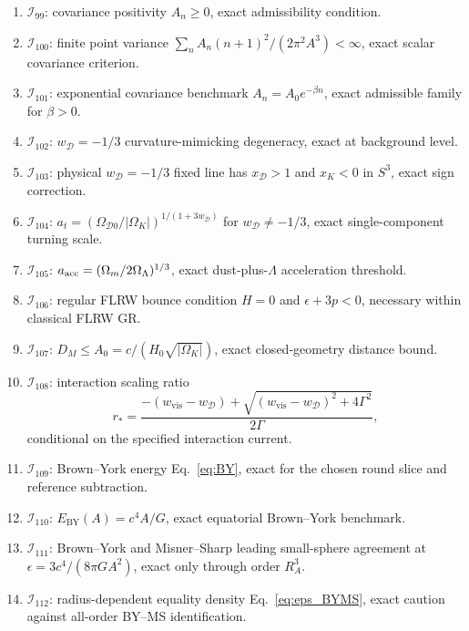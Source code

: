 \documentclass[
  aps,
  prd,
  reprint,
  superscriptaddress,
  nofootinbib,
  floatfix,
  longbibliography
]{revtex4-2}
\newcommand{\D}{\mathcal D}
\newcommand{\vis}{\mathrm{vis}}
\newcommand{\BY}{\mathrm{BY}}
\newcommand{\Inv}{\mathcal I}
\begin{document}
\begin{enumerate}
\item \(\Inv_{99}\): covariance positivity \(A_n\ge0\), exact admissibility
condition.

\item \(\Inv_{100}\): finite point variance
\(\sum_nA_n(n+1)^2/(2\pi^2A^3)<\infty\), exact scalar covariance criterion.

\item \(\Inv_{101}\): exponential covariance benchmark
\(A_n=A_0e^{-\beta n}\), exact admissible family for \(\beta>0\).

\item \(\Inv_{102}\): \(w_\D=-1/3\) curvature-mimicking degeneracy, exact at
background level.

\item \(\Inv_{103}\): physical \(w_\D=-1/3\) fixed line has \(x_\D>1\) and
\(x_K<0\) in \(S^3\), exact sign correction.

\item \(\Inv_{104}\): \(a_t=(\Omega_{\D0}/|\Omega_K|)^{1/(1+3w_\D)}\) for
\(w_\D\ne-1/3\), exact single-component turning scale.

\item \(\Inv_{105}\): \(a_{\rm acc}=(\Omega_m/2\Omega_\Lambda)^{1/3}\), exact
dust-plus-\(\Lambda\) acceleration threshold.

\item \(\Inv_{106}\): regular FLRW bounce condition
\(H=0\) and \(\epsilon+3p<0\), necessary within classical FLRW GR.

\item \(\Inv_{107}\): \(D_M\le A_0=c/(H_0\sqrt{|\Omega_K|})\), exact closed-geometry
distance bound.

\item \(\Inv_{108}\): interaction scaling ratio
\[
r_*=\frac{-(w_\vis-w_\D)+\sqrt{(w_\vis-w_\D)^2+4\Gamma^2}}{2\Gamma},
\]
conditional on the specified interaction current.

\item \(\Inv_{109}\): Brown--York energy Eq.~\eqref{eq:BY}, exact for the chosen
round slice and reference subtraction.

\item \(\Inv_{110}\): \(E_\BY(A)=c^4A/G\), exact equatorial Brown--York benchmark.

\item \(\Inv_{111}\): Brown--York and Misner--Sharp leading small-sphere agreement
at \(\epsilon=3c^4/(8\pi GA^2)\), exact only through order \(R_A^3\).

\item \(\Inv_{112}\): radius-dependent equality density Eq.~\eqref{eq:eps_BYMS},
exact caution against all-order BY--MS identification.


\end{enumerate}
\end{document}
